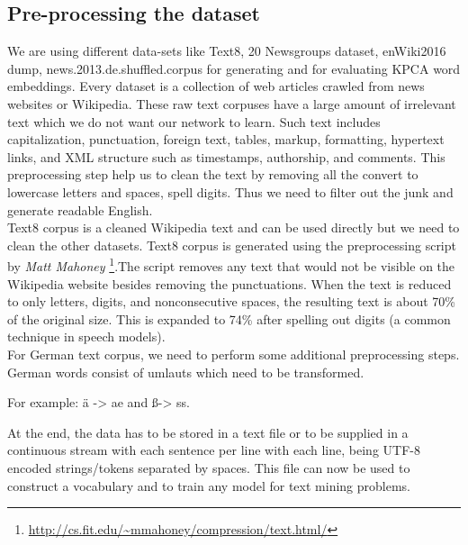  \subsection{Pre-processing the dataset}
 We are using different data-sets like Text8, 20 Newsgroups dataset, enWiki2016 dump, news.2013.de.shuffled.corpus for generating and for evaluating KPCA word embeddings. Every dataset is a collection of web articles crawled from news websites or Wikipedia. These raw text corpuses have a large amount of irrelevant text which we do not want our network to learn. Such text includes capitalization, punctuation, foreign text, tables, markup, formatting, hypertext links, and XML structure such as timestamps, authorship, and comments. This preprocessing step help us to clean the text by removing all the convert to lowercase letters and spaces, spell digits. Thus we need to filter out the junk and generate readable English.\\
 Text8 corpus is a cleaned Wikipedia text and can be used directly but we need to clean the other datasets. Text8 corpus is generated using the preprocessing script by \textit{Matt Mahoney} \footnote{\url{http://cs.fit.edu/~mmahoney/compression/text.html/}}.The script removes any text that would not be visible on the Wikipedia website besides removing the punctuations. When the text is reduced to only letters, digits, and nonconsecutive spaces, the resulting text is about 70\% of the original size. This is expanded to 74\% after spelling out digits (a common technique in speech models).\\ 
 For German text corpus, we need to perform some additional preprocessing steps. German words consist of umlauts which need to be transformed. 
 \begin{center}
 	 For example: {\"a} -> ae and \ss -> ss.
 \end{center}
 At the end, the data has to be stored in a text file or to be supplied in a continuous stream with each sentence per line with each line, being UTF-8 encoded strings/tokens separated by spaces. This file can now be used to construct a vocabulary and to train any model for text mining problems.

